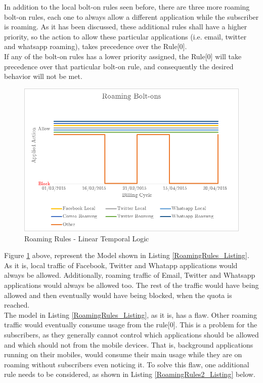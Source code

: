 In addition to the local bolt-on rules seen before, there are three more roaming bolt-on rules, each one to always allow a different application while the subscriber is roaming. As it has been discussed, these additional rules shall have a higher priority, so the action to allow these particular applications (i.e.  email, twitter and whatsapp roaming), takes precedence over the Rule[0].\\

If any of the bolt-on rules has a lower priority assigned, the Rule[0] will take precedence over that particular bolt-on rule, and consequently the desired behavior will not be met. 


\begin{figure}[H]
\centering
\includegraphics[width=1.00\textwidth]{image/Plans_RoamingRules}
\caption{Roaming Rules - Linear Temporal Logic}
\label{roamingRules}
\end{figure}

Figure \ref{roamingRules} above, represent the Model shown in Listing \ref{RoamingRules_Listing}. As it is, local traffic of Facebook, Twitter and Whatapp applications would always be allowed. Additionally, roaming traffic of Email, Twitter and Whatsapp applications would always be allowed too. The rest of the traffic would have being allowed and then eventually would have being blocked, when the quota is reached.  \\

The model in Listing \ref{RoamingRules_Listing}, as it is, has a flaw. Other roaming traffic would eventually consume usage from the rule[0]. This is a problem for the subscribers, as they generally cannot control which applications should be allowed and which should not from the mobile devices. That is, background applications running on their mobiles, would consume their main usage while they are on roaming without subscribers even noticing it. To solve this flaw, one additional rule needs to be considered, as shown in Listing \ref{RoamingRules2_Listing} below. \\ 

